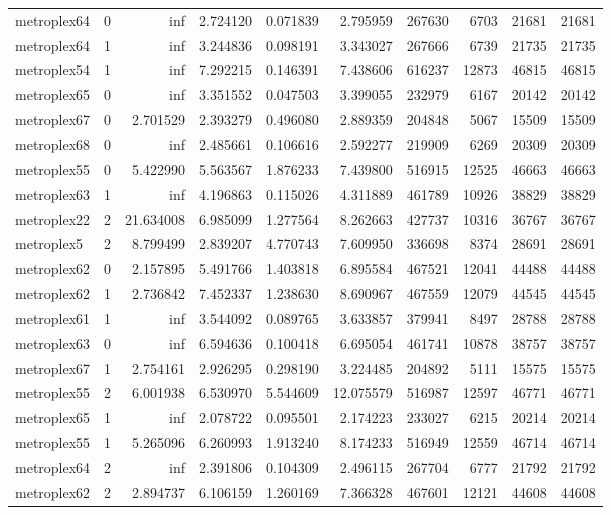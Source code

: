 \begin{longtable}{|l|r|r|r|r|r|r|r|r|r|}
metroplex64 & 0 & inf & 2.724120 & 0.071839 & 2.795959 & 267630 & 6703 & 21681 & 21681 \\
metroplex64 & 1 & inf & 3.244836 & 0.098191 & 3.343027 & 267666 & 6739 & 21735 & 21735 \\
metroplex54 & 1 & inf & 7.292215 & 0.146391 & 7.438606 & 616237 & 12873 & 46815 & 46815 \\
metroplex65 & 0 & inf & 3.351552 & 0.047503 & 3.399055 & 232979 & 6167 & 20142 & 20142 \\
metroplex67 & 0 & 2.701529 & 2.393279 & 0.496080 & 2.889359 & 204848 & 5067 & 15509 & 15509 \\
metroplex68 & 0 & inf & 2.485661 & 0.106616 & 2.592277 & 219909 & 6269 & 20309 & 20309 \\
metroplex55 & 0 & 5.422990 & 5.563567 & 1.876233 & 7.439800 & 516915 & 12525 & 46663 & 46663 \\
metroplex63 & 1 & inf & 4.196863 & 0.115026 & 4.311889 & 461789 & 10926 & 38829 & 38829 \\
metroplex22 & 2 & 21.634008 & 6.985099 & 1.277564 & 8.262663 & 427737 & 10316 & 36767 & 36767 \\
metroplex5 & 2 & 8.799499 & 2.839207 & 4.770743 & 7.609950 & 336698 & 8374 & 28691 & 28691 \\
metroplex62 & 0 & 2.157895 & 5.491766 & 1.403818 & 6.895584 & 467521 & 12041 & 44488 & 44488 \\
metroplex62 & 1 & 2.736842 & 7.452337 & 1.238630 & 8.690967 & 467559 & 12079 & 44545 & 44545 \\
metroplex61 & 1 & inf & 3.544092 & 0.089765 & 3.633857 & 379941 & 8497 & 28788 & 28788 \\
metroplex63 & 0 & inf & 6.594636 & 0.100418 & 6.695054 & 461741 & 10878 & 38757 & 38757 \\
metroplex67 & 1 & 2.754161 & 2.926295 & 0.298190 & 3.224485 & 204892 & 5111 & 15575 & 15575 \\
metroplex55 & 2 & 6.001938 & 6.530970 & 5.544609 & 12.075579 & 516987 & 12597 & 46771 & 46771 \\
metroplex65 & 1 & inf & 2.078722 & 0.095501 & 2.174223 & 233027 & 6215 & 20214 & 20214 \\
metroplex55 & 1 & 5.265096 & 6.260993 & 1.913240 & 8.174233 & 516949 & 12559 & 46714 & 46714 \\
metroplex64 & 2 & inf & 2.391806 & 0.104309 & 2.496115 & 267704 & 6777 & 21792 & 21792 \\
metroplex62 & 2 & 2.894737 & 6.106159 & 1.260169 & 7.366328 & 467601 & 12121 & 44608 & 44608 \\

\end{longtable}
